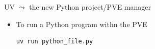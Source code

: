 \documentclass[11pt, serif, mathserif, compress]{beamer}  %
\newcommand{\boldtt}[1]{{\ttfamily\bfseries #1}}
\begin{document}
\begin{frame}[fragile]{UV $\leadsto$ the new Python project/PVE manager}

  \begin{tcolorbox}[title={\bf uv} command: \boldtt{run}, add to width=5mm]
    \begin{itemize}
    \item To run a Python program withn the PVE
      \begin{verbatim}
uv run python_file.py
      \end{verbatim}
    \end{itemize}
  \end{tcolorbox}


\end{frame}
\end{document}
